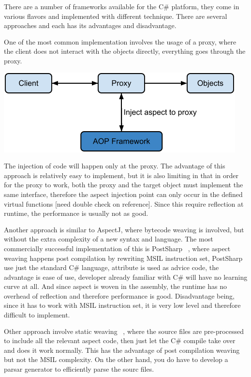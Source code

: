 There are a number of frameworks available for the C\# platform, they come in various flavors and implemented with different technique. There are several approaches and each has its advantages and disadvantage.

One of the most common implementation involves the usage of a proxy, where the client does not interact with the objects directly, everything goes through the proxy.

\includegraphics[scale=0.70]{proxy.png}

The injection of code will happen only at the proxy. The advantage of this approach is relatively easy to implement, but it is also limiting in that in order for the proxy to work, both the proxy and the target object must implement the same interface, therefore the aspect injection point can only occur in the defined virtual functions [need double check on reference]. Since this require reflection at runtime, the performance is usually not as good.

Another approach is similar to AspectJ, where bytecode weaving is involved, but without the extra complexity of a new syntax and language. The most commercially successful implementation of this is PostSharp ~\cite{postsharp}, where aspect weaving happens post compilation by rewriting MSIL instruction set, PostSharp use just the standard C\# language, attribute is used as advice code, the advantage is ease of use, developer already familiar with C\# will have no learning curve at all. And since aspect is woven in the assembly, the runtime has no overhead of reflection and therefore performance is good. Disadvantage being, since it has to work with MSIL instruction set, it is very low level and therefore difficult to implement.

Other approach involve static weaving ~\cite{aspectcs}, where the source files are pre-processed to include all the relevant aspect code, then just let the C\# compile take over and does it work normally. This has the advantage of post compilation weaving but not the MSIL complexity. On the other hand, you do have to develop a parsar generator to efficiently parse the sourc files.

